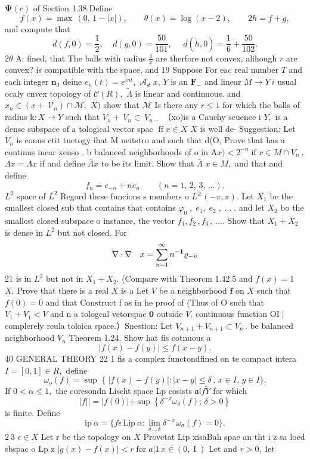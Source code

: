 $\mathbf{\Psi}(c)$ of Section 1.38.Define $$ f(x)=\operatorname*{max}\,(0,\,1-|x|),\qquad\theta(x)=\log(x-2),\qquad2h=f+g, $$ and compute that $$ d(f,0)=\frac{1}{2},~~~~~d(g,0)=\frac{50}{101},~~~~~~d(\dot{h},0)=\frac{1}{6}+\frac{50}{102}. $$ $2\theta$ A: fined, that The balls with radius $\textstyle{\frac{1}{x}}$ are therfore not convex, alihough ${\mathbf{}}r$ are convex? is compatible with the space, and 19 Suppose For eac real number ${\mathbf{}}T$ and each integer ${\boldsymbol{n}}_{\mathrm{{J}}}$ deine $e_{n}(t)=e^{i n t},$ ${\mathcal A}_{d}$ $x,\,Y$ is an ${\boldsymbol{F}}_{-}$ and linear $M\to Y\ i$ usual ocaly cnvex topology of ${\mathcal{C}}(R),$ $\tilde{\Lambda}$ is linear and continuous. and $x_{n}\in(x+\ {\mathcal{V}}_{n})\cap{\mathcal{M}},$ $X)$ show that $\mathcal{M}$ Is there any $\scriptstyle r\leq1$ for which the balls of radius ${\mathrm{k}}\colon X\to Y$ such that $V_{n}+\,V_{n}\subset\,V_{n-}$ （xo)is a Cauchy seuence i $\textstyle Y,$ is a dense subspace of a tological vector spac $\operatorname{ff}x\in X$ $\textstyle X$ is well de- Suggestion: Let ${\mathit{V}}_{n}$ is conus ctit tuetogy ihat M neitstro and such that d(O, Prove that has a continus inear xenso . b balanced neighborhoods of o in $\mathrm{A}x)<2^{-n}\operatorname*{if}x\in M\cap V_{n}\ .$ $\Lambda x=\Lambda x$ if and define ${\bar{\Lambda}}x$ to be its limit. Show that $\bar{\Lambda}$ $x\in M,$ and that and define $$ f_{n}=e_{-n}+n e_{n}\qquad(n=1,\,2,\,3,\,\ldots). $$ $L^{2}$ space of $L^{2}$ Regard thcse funcions s members o $L^{\geq}(-\pi,\pi).$ Let $X_{1}$ be the smallest closed sub that contains that contains $\varphi_{0}\;,\;e_{1},\;e_{2}\;,\;.\;.\;.$ and let $X_{2}$ bo the smallcst closed subspace o instance, the vector $f_{1},f_{2}\,,f_{3}\,,\,\ldots.$ Show that $X_{1}+X_{2}$ is dense in $L^{2}$ but not closed. For $$ {\bf\nabla\cdot\nabla}\quad x=\sum_{n=1}^{\infty}n^{-{\bf1}}{\varrho_{-n}} $$ 21 is in $L^{2}$ but not in $X_{1}+X_{2}.$ (Compare with Theorcm 1.42.5 and $f(x)=1$ $X.$ Prove that there is a real $\textstyle X$ is a Let ${\mathbf{}}V$ be a neighborhood $\boldsymbol{f}$ on $X$ such that $f(0)=0$ and that Construct f as in he proof of (Thus of O such that $V_{1}+V_{1}<V$ and n a tologcal vetorspac $\mathbf{0}$ outside ${\mathit{V}}.$ continuous function $\mathrm{OI}\mid$ complerely reula toloica space.）Snestion: Let $V_{n+1}+V_{n+1}\subset V_{n}\,.$ be balanced ncighborhood $V_{n}$ Theorem 1.24. Show hat fis cotnuous a $$ |f(x)-f(y)|\leq f(x-y). $$40 GENERAL THEORY 22 1 fis a complex functondfined on te compact intera $I=[0,1]\in R,$ define $$ \omega_{o}(f)=\operatorname*{sup}\;\{\;|f(x)-f(y)|:|x-y|\leq\delta\,,\,x\in I,\,y\in I\}. $$ If $0<\alpha\leq1,$ the coresondn Lischt space Lp cosists ${\mathfrak{a l}}f{\tilde{Y}}$ for which $$ |f||=|f(0)|+\operatorname*{sup}\left\{\delta^{-x}\omega_{\delta}(f);\,\delta>0\right\} $$ is finite. Define $$ {\mathrm{ip~}}\alpha=\{f\epsilon\,{\mathrm{Lip~}}\alpha:\operatorname*{lim}_{\delta\,\ldots\,\delta}\delta^{-\,x}\omega_{\sigma}(f)=0\}. $$ $2{\ 3}$ $\scriptstyle\epsilon\in X$ Let r be the topology on $\textstyle X$ Provetat Lip xisaBah spae an tht i z sa loed sbspac o Lp z $|g(x)-f(x)|<r\operatorname{for}a|1\,x\in(0,\operatorname{I})$ Let and $r>0,$ let 